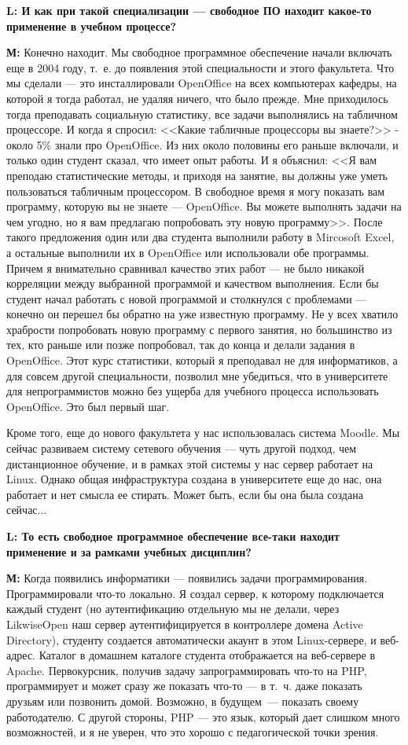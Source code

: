 \documentclass[10pt, a5paper]{article}
\begin{document}
{\noindent \bf L: И как при такой специализации --- свободное ПО находит какое-то применение в учебном процессе?}

{\noindent \bf М:} Конечно находит. Мы свободное программное обеспечение начали включать еще в 2004 году, т.~е. до появления этой специальности и этого факультета. Что мы сделали --- это инсталлировали OpenOffice на всех компьютерах кафедры, на которой я тогда работал, не удаляя ничего, что было прежде. Мне приходилось тогда преподавать социальную статистику, все задачи выполнялись на табличном процессоре. И когда я спросил: <<Какие табличные процессоры вы знаете?>> - около 5\% знали про OpenOffice. Из них около половины его раньше включали, и только один студент сказал, что имеет опыт работы. И я объяснил: <<Я вам преподаю статистические методы, и приходя на занятие, вы должны уже уметь пользоваться табличным процессором. В свободное время я могу показать вам программу, которую вы не знаете --- OpenOffice. Вы можете выполнять задачи на чем угодно, но я вам предлагаю попробовать эту новую программу>>. После такого предложения один или два студента выполнили работу в Mircosoft Excel, а остальные выполнили их в OpenOffice или использовали обе программы. Причем я внимательно сравнивал качество этих работ --- не было никакой корреляции между выбранной программой и качеством выполнения. Если бы студент начал работать с новой программой и столкнулся с проблемами --- конечно он перешел бы обратно на уже известную программу. Не у всех хватило храбрости попробовать новую программу с первого занятия, но большинство из тех, кто раньше или позже попробовал, так до конца и делали задания в OpenOffice. Этот курс статистики, который я преподавал не для информатиков, а для совсем другой специальности, позволил мне убедиться, что в университете для непрограммистов можно без ущерба для учебного процесса использовать OpenOffice. Это был первый шаг.

Кроме того, еще до нового факультета у нас использовалась система Moodle. Мы сейчас развиваем систему сетевого обучения --- чуть другой подход, чем дистанционное обучение, и в рамках этой системы у нас сервер работает на Linux. Однако общая  инфраструктура создана в университете еще до нас, она работает и нет смысла ее стирать. Может быть, если бы она была создана сейчас...

{\noindent \bf L: То есть свободное программное обеспечение все-таки находит применение и за рамками учебных дисциплин?}

{\noindent \bf М:} Когда появились информатики --- появились задачи программирования. Программировали что-то локально. Я  создал сервер, к которому подключается каждый студент (но аутентификацию отдельную мы не делали, через LikwiseOpen наш сервер аутентифицируется в контроллере домена Active Directory), студенту создается автоматически акаунт в этом Linux-сервере, и веб-адрес. Каталог в домашнем каталоге студента отображается на веб-сервере в Apache. Первокурсник, получив задачу запрограммировать что-то на PHP, программирует и может сразу же показать что-то --- в т.~ч. даже показать друзьям или позвонить домой. Возможно, в будущем~--- показать своему работодателю. С другой стороны, PHP --- это язык, который дает слишком много возможностей, и я не уверен, что это хорошо с педагогической точки зрения.
\end{document}
